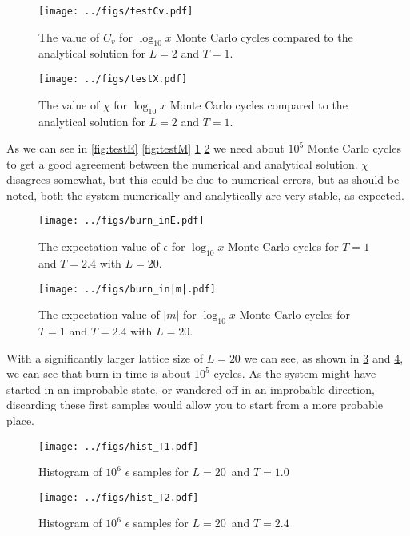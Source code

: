 \documentclass[english,notitlepage,reprint,nofootinbib]{revtex4-1}  %
\begin{document}
\begin{figure}[H]
	\centering
	\texttt{[image: ../figs/testCv.pdf]} %
	\caption{The value of $C_v$ for $\log_{10} x$ Monte Carlo cycles compared to the analytical solution for $L=2$ and $T=1$.}
	\label{fig:testCv}
\end{figure}

\begin{figure}[H]
	\centering
	\texttt{[image: ../figs/testX.pdf]} %
	\caption{The value of $\chi$ for $\log_{10} x$ Monte Carlo cycles compared to the analytical solution for $L=2$ and $T=1$.}
	\label{fig:testX}
\end{figure}

As we can see in \ref{fig:testE} \ref{fig:testM} \ref{fig:testCv} \ref{fig:testX} we need about $10^5$ Monte Carlo cycles to get a good agreement between the numerical and analytical solution. $\chi$ disagrees somewhat, but this could be due to numerical errors, but as should be noted, both the system numerically and analytically are very stable, as expected.
\begin{figure}[H]
	\centering
	\texttt{[image: ../figs/burn\_inE.pdf]} %
	\caption{The expectation value of $\epsilon$ for $\log_{10} x$ Monte Carlo cycles for $T=1$ and $T=2.4$ with $L=20$.}
	\label{fig:burn_inE}
\end{figure}

\begin{figure}[H]
	\centering
	\texttt{[image: ../figs/burn\_in|m|.pdf]} %
	\caption{The expectation value of $|m|$ for $\log_{10} x$ Monte Carlo cycles for $T=1$ and $T=2.4$ with $L=20$.}
	\label{fig:burn_in|m|}
\end{figure}

With a significantly larger lattice size of $L=20$ we can see, as shown in \ref{fig:burn_inE} and \ref{fig:burn_in|m|}, we can see that burn in time is about $10^5$ cycles. As the system might have started in an improbable state, or wandered off in an improbable direction, discarding these first samples would allow you to start from a more probable place.

\begin{figure}[H]
	\centering
	\texttt{[image: ../figs/hist\_T1.pdf]} %
	\caption{Histogram of $10^6$ $\epsilon$ samples for $L=20$ and $T=1.0$}
	\label{fig:hist_T1}
\end{figure}

\begin{figure}[H]
	\centering
	\texttt{[image: ../figs/hist\_T2.pdf]} %
	\caption{Histogram of $10^6$ $\epsilon$ samples for $L=20$ and $T=2.4$}
	\label{fig:hist_T2}
\end{figure}
\end{document}
